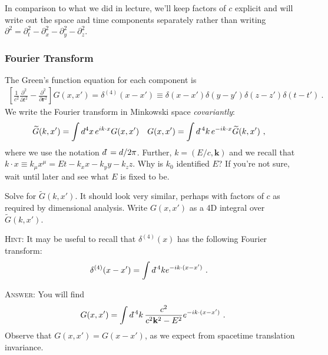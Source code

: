 \documentclass[12pt]{article}
\numberwithin{equation}{subsection}    %
\renewcommand{\tilde}{\widetilde}   %
\renewcommand{\vec}[1]{\mathbf{#1}} %
\newcommand{\dbar}{d\mkern-6mu\mathchar'26}    %
\begin{document}
In comparison to what we did in lecture, we'll keep factors of $c$ explicit and will write out the space and time components separately rather than writing $\partial^2 = \partial_t^2 -\partial_x^2 -\partial_y^2 -\partial_z^2$.




\subsubsection{Fourier Transform}

The Green's function equation for each component is
\begin{align}
	\left[\frac{1}{c^2}\frac{\partial^2}{\partial t^2} - \frac{\partial^2}{\partial \vec{r}^2}\right] G(x,x') = \delta^{(4)}(x-x') \equiv \delta(x-x')\delta(y-y')\delta(z-z')\delta(t-t') \ .
	\label{eq:4D:define:G}
\end{align}
We write the Fourier transform in Minkowski space \emph{covariantly}:
\begin{align}
	\tilde G(k,x') &= \int d^4x \, e^{ik\cdot x} G(x,x')
	&
	G(x,x') &= \int \dbar^4k \, e^{-ik\cdot x} \tilde G(k,x') \ ,
\end{align}
where we use the notation $\dbar = d/2\pi$. Further, $k = (E/c,\vec k)$ and we recall that $k\cdot x \equiv k_\mu x^\mu = Et - k_x x - k_y y - k_z z$. 
Why is $k_0$ identified $E$? If you're not sure, wait until later and see what $E$ is fixed to be. 

Solve for $\tilde G(k,x')$. It should look very similar, perhaps with factors of $c$ as required by dimensional analysis.  Write $G(x,x')$ as a 4D integral over $\tilde G(k,x')$.

\textsc{Hint:} It may be useful to recall that $\delta^{(4)}(x)$ has the following Fourier transform: 
\begin{align}
	\delta^{(4)}(x-x') &= \int \dbar^4 k e^{-ik\cdot (x-x')} \ .
\end{align}

\textsc{Answer:} You will find
\begin{align}
	G(x,x') = \int \dbar^4k \, \frac{c^2}{c^2 \vec k^2 - E^2} e^{-ik\cdot (x-x')} \ .
	\label{eq:G:ft:1}
\end{align} 
Observe that $G(x,x') = G(x-x')$, as we expect from spacetime translation invariance.
\end{document}
